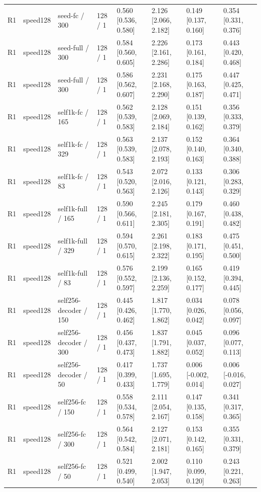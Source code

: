 \begin{tabular}{llllllll}
R1 & speed128 & seed-fc / 300 & 128 / 1 & 0.560 [0.536, 0.580] & 2.126 [2.066, 2.182] & 0.149 [0.137, 0.160] & 0.354 [0.331, 0.376] \\
R1 & speed128 & seed-full / 300 & 128 / 1 & 0.584 [0.560, 0.605] & 2.226 [2.161, 2.286] & 0.173 [0.161, 0.184] & 0.443 [0.420, 0.468] \\
R1 & speed128 & seed-full / 300 & 128 / 1 & 0.586 [0.562, 0.607] & 2.231 [2.168, 2.290] & 0.175 [0.163, 0.187] & 0.447 [0.425, 0.471] \\
R1 & speed128 & self1k-fc / 165 & 128 / 1 & 0.562 [0.539, 0.583] & 2.128 [2.069, 2.184] & 0.151 [0.139, 0.162] & 0.356 [0.333, 0.379] \\
R1 & speed128 & self1k-fc / 329 & 128 / 1 & 0.563 [0.539, 0.583] & 2.137 [2.078, 2.193] & 0.152 [0.140, 0.163] & 0.364 [0.340, 0.388] \\
R1 & speed128 & self1k-fc / 83 & 128 / 1 & 0.543 [0.520, 0.563] & 2.072 [2.016, 2.126] & 0.133 [0.121, 0.143] & 0.306 [0.283, 0.329] \\
R1 & speed128 & self1k-full / 165 & 128 / 1 & 0.590 [0.566, 0.611] & 2.245 [2.181, 2.305] & 0.179 [0.167, 0.191] & 0.460 [0.438, 0.482] \\
R1 & speed128 & self1k-full / 329 & 128 / 1 & 0.594 [0.570, 0.615] & 2.261 [2.198, 2.322] & 0.183 [0.171, 0.195] & 0.475 [0.451, 0.500] \\
R1 & speed128 & self1k-full / 83 & 128 / 1 & 0.576 [0.552, 0.597] & 2.199 [2.136, 2.259] & 0.165 [0.152, 0.177] & 0.419 [0.394, 0.445] \\
R1 & speed128 & self256-decoder / 150 & 128 / 1 & 0.445 [0.426, 0.462] & 1.817 [1.770, 1.862] & 0.034 [0.026, 0.042] & 0.078 [0.056, 0.097] \\
R1 & speed128 & self256-decoder / 300 & 128 / 1 & 0.456 [0.437, 0.473] & 1.837 [1.791, 1.882] & 0.045 [0.037, 0.052] & 0.096 [0.077, 0.113] \\
R1 & speed128 & self256-decoder / 50 & 128 / 1 & 0.417 [0.399, 0.433] & 1.737 [1.695, 1.779] & 0.006 [-0.002, 0.014] & 0.006 [-0.016, 0.027] \\
R1 & speed128 & self256-fc / 150 & 128 / 1 & 0.558 [0.534, 0.578] & 2.111 [2.054, 2.167] & 0.147 [0.135, 0.158] & 0.341 [0.317, 0.365] \\
R1 & speed128 & self256-fc / 300 & 128 / 1 & 0.564 [0.542, 0.584] & 2.127 [2.071, 2.181] & 0.153 [0.142, 0.165] & 0.355 [0.331, 0.379] \\
R1 & speed128 & self256-fc / 50 & 128 / 1 & 0.521 [0.499, 0.540] & 2.002 [1.947, 2.053] & 0.110 [0.099, 0.120] & 0.243 [0.221, 0.263] \\

\end{tabular}
